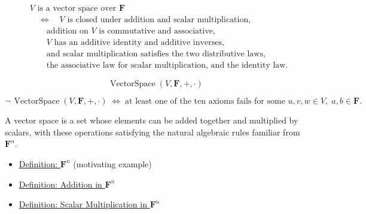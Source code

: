 \begin{remark*}
\[
\begin{aligned}
&V \text{ is a vector space over } \mathbf{F} \\
&\quad\Longleftrightarrow\quad
\text{$V$ is closed under addition and scalar multiplication,} \\
&\qquad\text{addition on $V$ is commutative and associative,} \\
&\qquad\text{$V$ has an additive identity and additive inverses,} \\
&\qquad\text{and scalar multiplication satisfies the two distributive laws,} \\
&\qquad\text{the associative law for scalar multiplication, and the identity law.}
\end{aligned}
\]
\end{remark*}

\begin{remark*}
\[
\operatorname{VectorSpace}(V,\mathbf{F},+,\cdot)
\]
\end{remark*}

\begin{remark*}
\[
\neg\,\operatorname{VectorSpace}(V,\mathbf{F},+,\cdot)
\;\Longleftrightarrow\;
\text{at least one of the ten axioms fails for some } u,v,w \in V,\; a,b \in \mathbf{F}.
\]
\end{remark*}

\begin{remark*}[Interpretation]
A vector space is a set whose elements can be added together and multiplied
by scalars, with these operations satisfying the natural algebraic rules
familiar from $\mathbf{F}^n$.
\end{remark*}

\begin{dependencies}
\begin{itemize}
  \item \hyperref[def:fn]{Definition: $\mathbf{F}^n$} (motivating example)
  \item \hyperref[def:addition-in-fn]{Definition: Addition in $\mathbf{F}^n$}
  \item \hyperref[def:scalar-multiplication-in-fn]{Definition: Scalar Multiplication in $\mathbf{F}^n$}
\end{itemize}
\end{dependencies}


